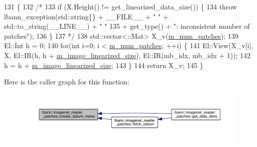 \begin{DoxyCode}
131                                                                                          \{
132 \textcolor{comment}{/*}
133 \textcolor{comment}{  if (X.Height() != get\_linearized\_data\_size()) \{}
134 \textcolor{comment}{    throw lbann\_exception(std::string\{\} + \_\_FILE\_\_ + " " + std::to\_string(\_\_LINE\_\_) + " "}
135 \textcolor{comment}{                          + get\_type() + ": inconsistent number of patches");}
136 \textcolor{comment}{  \}}
137 \textcolor{comment}{*/}
138   std::vector<::Mat> X\_v(\hyperlink{classlbann_1_1imagenet__reader__patches_a3380936d3d01d5efc77f0f129891fc65}{m\_num\_patches});
139   El::Int h = 0;
140   \textcolor{keywordflow}{for}(\textcolor{keywordtype}{int} i=0; i < \hyperlink{classlbann_1_1imagenet__reader__patches_a3380936d3d01d5efc77f0f129891fc65}{m\_num\_patches}; ++i) \{
141     El::View(X\_v[i], X, El::IR(h, h + \hyperlink{classlbann_1_1image__data__reader_af512f1f866c0f654309b7f28886dca9a}{m\_image\_linearized\_size}), El::IR(mb\_idx, 
      mb\_idx + 1));
142     h = h + \hyperlink{classlbann_1_1image__data__reader_af512f1f866c0f654309b7f28886dca9a}{m\_image\_linearized\_size};
143   \}
144   \textcolor{keywordflow}{return} X\_v;
145 \}
\end{DoxyCode}
Here is the caller graph for this function\+:\nopagebreak
\begin{figure}[H]
\begin{center}
\leavevmode
\includegraphics[width=350pt]{classlbann_1_1imagenet__reader__patches_a920f235bde95d5c3e8ae97c389c9d953_icgraph}
\end{center}
\end{figure}
\mbox{\label{classlbann_1_1imagenet__reader__patches_a8a9e4a1339f2e9676a0e653853ebff3c}} 
